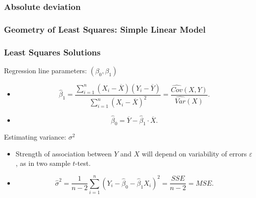 \documentclass[handout]{beamer}
\begin{document}


   \begin{frame}
   \frametitle{Absolute deviation}
   \begin{center}
   \end{center}

   \end{frame}


   \begin{frame} \frametitle{Geometry of Least Squares: Simple Linear Model}

   \end{frame}


   \begin{frame} \frametitle{Least Squares Solutions}

   \begin{block}
   {Regression line parameters: $(\beta_0, \beta_1)$}
   \begin{itemize}[<+->]
   \item $$
   \widehat{\beta}_1 = \frac{\sum_{i=1}^n(X_i - \overline{X})(Y_i - \overline{Y})}{\sum_{i=1}^n (X_i-\overline{X})^2} = \frac{\widehat{Cov}(X,Y)}{\widehat{Var}(X)}.$$

   \item $$\widehat{\beta}_0 = \overline{Y} - \widehat{\beta}_1 \cdot \overline{X}.$$

   \end{itemize}
   \end{block}
   \begin{block}
   {Estimating variance: $\sigma^2$}
   \begin{itemize}[<+->]
   \item  Strength of association between $Y$ and $X$ will depend on variability of errors $\varepsilon$,  as in two sample $t$-test.

   \item $$
   \widehat{\sigma}^2 = \frac{1}{n-2} \sum_{i=1}^n (Y_i - \widehat{\beta}_0 - \widehat{\beta}_1 X_i)^2 = \frac{SSE}{n-2} = MSE.$$
   \end{itemize}
   \end{block}
   \end{frame}
\end{document}
